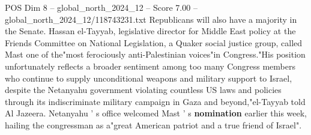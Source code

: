 \begin{textsample}{POS Dim 8 – global\_north\_2024\_12 – Score 7.00 – global\_north\_2024\_12/118743231.txt}
Republicans will also have a majority in the Senate.
Hassan el-Tayyab, legislative director for Middle East policy at the Friends Committee on National Legislation, a Quaker social justice group, called Mast one of the"most ferociously anti-Palestinian voices"in Congress."His position unfortunately reflects a broader sentiment among too many Congress members who continue to supply unconditional weapons and military support to Israel, despite the Netanyahu government violating countless US laws and policies through its indiscriminate military campaign in Gaza and beyond,"el-Tayyab told Al Jazeera.
Netanyahu ' s office welcomed Mast ' s \textbf{nomination} earlier this week, hailing the congressman as a"great American patriot and a true friend of Israel".

\end{textsample}
